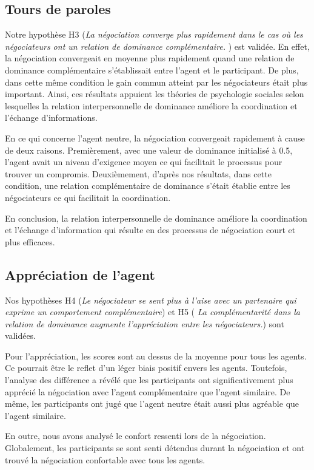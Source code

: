 	
	\subsection{Tours de paroles}
	Notre hypothèse H3 (\textit{La négociation converge plus rapidement dans le cas où les négociateurs ont un relation de dominance complémentaire. }) est validée. En effet, la négociation convergeait en moyenne plus rapidement quand une relation de dominance complémentaire s'établissait entre l'agent et le participant. De plus, dans cette même condition le gain commun atteint par les négociateurs était plus important. Ainsi, ces résultats appuient les théories de  psychologie sociales selon lesquelles la relation interpersonnelle de dominance améliore la coordination et l'échange d'informations.
	
		
	En ce qui concerne l'agent neutre, la négociation convergeait rapidement à cause de deux raisons. Premièrement, avec une valeur de dominance initialisé à 0.5, l'agent avait un niveau d'exigence moyen ce qui facilitait le processus pour trouver un compromis. 
	Deuxièmement, d'après nos résultats, dans cette condition, une relation complémentaire de dominance s'était établie entre les négociateurs ce qui facilitait la coordination. 
	
	En conclusion, la relation interpersonnelle de dominance améliore la coordination et l'échange d'information qui résulte en des processus de négociation court et plus efficaces. 
	
	\subsection{Appréciation de l'agent}
	Nos hypothèses H4 (\textit{Le négociateur se sent plus à l'aise avec un partenaire qui exprime un comportement complémentaire})  et H5 (\textit{ La complémentarité dans la relation de dominance augmente l'appréciation entre les négociateurs.}) sont validées. 
	
	Pour l’appréciation, les scores sont au dessus de la moyenne pour tous les agents. Ce pourrait être le reflet d’un léger biais positif envers les agents. Toutefois, l'analyse des différence a révélé que les participants ont significativement plus apprécié la négociation avec l'agent complémentaire que l'agent similaire. De même, les participants ont jugé que l'agent neutre était aussi plus agréable que l'agent similaire. 
	
	En outre, nous avons analysé le confort ressenti lors de la négociation. Globalement, les participants se sont senti détendus durant la négociation et ont trouvé la négociation confortable avec tous les agents.  
	
